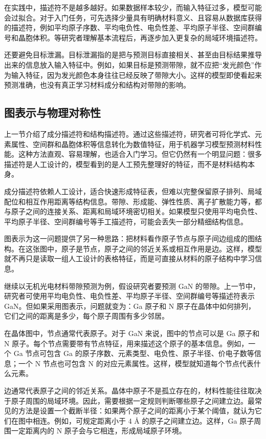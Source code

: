 在实践中，描述符不是越多越好。如果数据样本较少，而输入特征过多，模型可能会过拟合。对于入门任务，可先选择少量具有明确材料意义、且容易从数据库获得的描述符，例如平均原子序数、平均电负性、电负性差、平均原子半径、空间群编号和晶胞体积。等研究者理解基本流程后，再逐步加入更复杂的局域环境描述符。


还要避免目标泄漏。目标泄漏指的是把与预测目标直接相关、甚至由目标结果推导出来的信息放入输入特征中。例如，如果目标是预测带隙，就不应把“发光颜色”作为输入特征，因为发光颜色本身往往已经反映了带隙大小。这样的模型即使看起来预测准确，也没有真正学习材料成分和结构对带隙的影响。


\subsection{图表示与物理对称性}

上一节介绍了成分描述符和结构描述符。通过这些描述符，研究者可将化学式、元素属性、空间群和晶胞体积等信息转化为数值特征，用于机器学习模型预测材料性能。这种方法直观、容易理解，也适合入门学习。但它仍然有一个明显问题：很多描述符是人工设计的，模型看到的是人工预先整理好的特征，而不是材料结构本身。


成分描述符依赖人工设计，适合快速形成特征表，但难以完整保留原子排列、局域配位和相互作用距离等结构信息。带隙、形成能、弹性性质、离子扩散能力等，都与原子之间的连接关系、距离和局域环境密切相关。如果模型只使用平均电负性、平均原子半径、空间群编号等手工描述符，可能会丢失一部分精细结构信息。


图表示为这一问题提供了另一种思路：把材料看作原子节点与原子间边组成的图结构。在这张图中，原子是节点，原子之间的邻近关系或相互作用是边。这样，模型就不再只是读取一组人工设计的表格特征，而是可直接从材料的原子结构中学习信息。


继续以无机光电材料带隙预测为例，假设研究者要预测 GaN 的带隙。上一节中，研究者可使用平均电负性、电负性差、平均原子半径、空间群编号等描述符表示 GaN。但如果采用图表示，问题就变为：Ga 原子和 N 原子在晶体中如何排列，它们之间的距离是多少，每个原子周围有多少邻居。


在晶体图中，节点通常代表原子。对于 GaN 来说，图中的节点可以是 Ga 原子和 N 原子。每个节点需要带有节点特征，用来描述这个原子的基本信息。例如，一个 Ga 节点可包含 Ga 的原子序数、元素类型、电负性、原子半径、价电子数等信息；一个 N 节点也可包含 N 的对应元素属性。这样，模型就知道每个节点代表什么元素。


边通常代表原子之间的邻近关系。晶体中原子不是孤立存在的，材料性能往往取决于原子周围的局域环境。因此，需要根据一定规则判断哪些原子之间建立边。最常见的方法是设置一个截断半径：如果两个原子之间的距离小于某个阈值，就认为它们在图中相连。例如，可规定距离小于 4 \AA{} 的原子之间建立边。这样，Ga 原子周围一定距离内的 N 原子会与它相连，形成局域原子环境。


